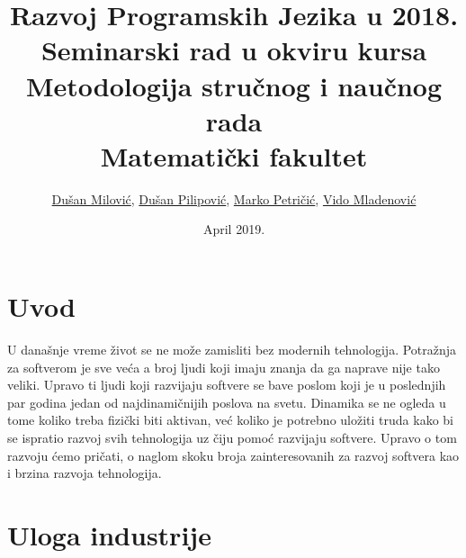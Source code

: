 \documentclass[a4paper]{article}
\begin{document}
\title{Razvoj Programskih Jezika u 2018.\\ \small{Seminarski rad u okviru kursa\\Metodologija stručnog i naučnog rada\\ Matematički fakultet}}

\author{ \href{mailto:dusan95kv@gmail.com}{Dušan Milović}, \href{mailto:dusanpilipovic95@gmail.com}{Dušan Pilipović}, \href{mailto:petricicmarko1995@gmail.com}{Marko Petričić}, \href{mailto:vido!!!!!@gmail.com}{Vido Mladenović}}

\date{April 2019.}

\maketitle


\tableofcontents

\newpage

\section{Uvod}
\label{sec:uvod}

U današnje vreme život se ne može zamisliti bez modernih tehnologija. Potražnja za softverom je sve veća a broj ljudi koji imaju znanja da ga naprave nije tako veliki. Upravo ti ljudi koji razvijaju softvere se bave poslom koji je u poslednjih par godina jedan od najdinamičnijih poslova na svetu. Dinamika se ne ogleda u tome koliko treba fizički biti aktivan, već koliko je potrebno uložiti truda kako bi se ispratio razvoj svih tehnologija uz čiju pomoć razvijaju softvere. Upravo o tom razvoju ćemo pričati, o naglom skoku broja zainteresovanih za razvoj softvera kao i brzina razvoja tehnologija.

\section{Uloga industrije}
\label{sec:uloga industrije}
\end{document}
